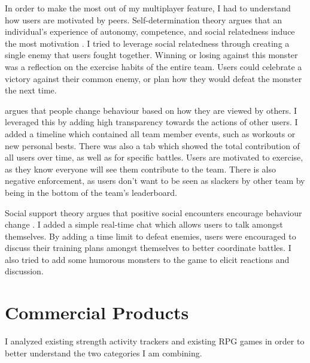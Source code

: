 \documentclass{l4proj}
\begin{document}
In order to make the most out of my multiplayer feature, I had to understand how users are motivated by peers. Self-determination theory argues that an individual's experience of autonomy, competence, and social relatedness induce the most motivation \citep{self_determination_theory}. I tried to leverage social relatedness through creating a single enemy that users fought together. Winning or losing against this monster was a reflection on the exercise habits of the entire team. Users could celebrate a victory against their common enemy, or plan how they would defeat the monster the next time.

\citet{social_comparison_theory} argues that people change behaviour based on how they are viewed by others. I leveraged this by adding high transparency towards the actions of other users. I added a timeline which contained all team member events, such as workouts or new personal bests. There was also a tab which showed the total contribution of all users over time, as well as for specific battles. Users are motivated to exercise, as they know everyone will see them contribute to the team. There is also negative enforcement, as users don't want to be seen as slackers by other team by being in the bottom of the team's leaderboard.

Social support theory argues that positive social encounters encourage behaviour change \citep{social_support_theory}. I added a simple real-time chat which allows users to talk amongst themselves. By adding a time limit to defeat enemies, users were encouraged to discuss their training plans amongst themselves to better coordinate battles. I also tried to add some humorous monsters to the game to elicit reactions and discussion. 

\section{Commercial Products}
I analyzed existing strength activity trackers and existing RPG games in order to better understand the two categories I am combining. 
\end{document}
